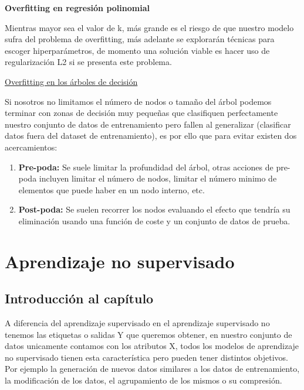 \documentclass[11pt,fleqn]{book} %
\begin{document}
\textbf{Overfitting en regresión polinomial}

Mientras mayor sea el valor de k, más grande es el riesgo de que nuestro modelo sufra del problema de overfitting, más adelante se explorarán técnicas para escoger hiperparámetros, de momento una solución viable es hacer uso de regularización L2 si se presenta este problema.


\underline{Overfitting en los árboles de decisión}

Si nosotros no limitamos el número de nodos o tamaño del árbol podemos terminar con zonas de decisión muy pequeñas que clasifiquen perfectamente nuestro conjunto de datos de entrenamiento pero fallen al generalizar (clasificar datos fuera del dataset de entrenamiento), es por ello que para evitar existen dos acercamientos:

\begin{enumerate}
\item \textbf{Pre-poda:} Se suele limitar la profundidad del árbol, otras acciones de pre-poda incluyen limitar el número de nodos, limitar el número minimo de elementos que puede haber en un nodo interno, etc.
\item \textbf{Post-poda:} Se suelen recorrer los nodos evaluando el efecto que tendría su eliminación usando una función de coste y un conjunto de datos de prueba.

\end{enumerate}




\chapter{Aprendizaje no supervisado}

\section{Introducción al capítulo} 

A diferencia del aprendizaje supervisado en el aprendizaje supervisado no tenemos las etiquetas o salidas Y que queremos obtener, en nuestro conjunto de datos unicamente contamos con los atributos X, todos los modelos de aprendizaje no supervisado tienen esta característica pero pueden tener distintos objetivos. Por ejemplo la generación de nuevos datos similares a los datos de entrenamiento, la modificación de los datos, el agrupamiento de los mismos o su compresión.
\end{document}
